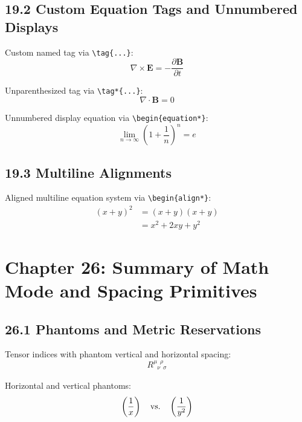 \documentclass{article}
\begin{document}
\subsection*{19.2 Custom Equation Tags and Unnumbered Displays}
Custom named tag via \verb|\tag{...}|:
\begin{equation}
\nabla \times \mathbf{E} = -\frac{\partial \mathbf{B}}{\partial t} \tag{Faraday}
\end{equation}

Unparenthesized tag via \verb|\tag*{...}|:
\begin{equation}
\nabla \cdot \mathbf{B} = 0 \tag*{[Gauss]}
\end{equation}

Unnumbered display equation via \verb|\begin{equation*}|:
\begin{equation*}
\lim_{n\to\infty} \left( 1 + \frac{1}{n} \right)^n = e
\end{equation*}

\subsection*{19.3 Multiline Alignments}
Aligned multiline equation system via \verb|\begin{align*}|:
\begin{align*}
(x + y)^2 &= (x + y)(x + y) \\
&= x^2 + 2xy + y^2
\end{align*}

\section*{Chapter 26: Summary of Math Mode and Spacing Primitives}

\subsection*{26.1 Phantoms and Metric Reservations}
Tensor indices with phantom vertical and horizontal spacing:
\begin{equation}
R^{\mu\phantom{\nu}\rho}_{\phantom{\mu}\nu\phantom{\rho}\sigma}
\end{equation}

Horizontal and vertical phantoms:
\begin{equation}
\left( \frac{1}{\vphantom{y^2}x} \right) \quad \text{vs.} \quad \left( \frac{1}{y^2} \right)
\end{equation}
\end{document}
